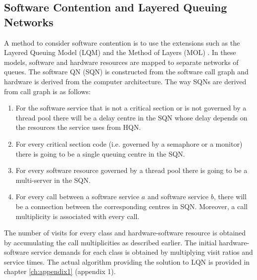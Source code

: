  \subsection{Software Contention and Layered Queuing Networks} 
 A method to consider software contention is to use the extensions such as the Layered Queuing Model (LQM) and the Method of Layers (MOL) \cite{rolia_method_1995}. In these models, software and hardware resources are mapped to separate networks of queues. The software QN \cite{rolia_method_1995} (SQN) is constructed from the software call graph and hardware is derived from the computer architecture. 
 The way SQNs are derived from call graph is as follows:  
 \begin{enumerate} 
 \item For the software service that is not a critical section or is not governed by a thread pool there will be a delay centre in the SQN whose delay depends on the resources the service uses from HQN. 
 \item For every critical section code (i.e. governed by a semaphore or a monitor) there is going to be a single queuing centre in the SQN.
 \item For every software resource governed by a thread pool there is going to be a multi-server in the SQN. 
  \item For every call between a software service $a$ and software service $b$, there will be a connection between the corresponding centres in SQN. Moreover, a call multiplicity is associated with every call.  
 \end{enumerate}
  
   The number of visits for every class and hardware-software resource is obtained by accumulating the call multiplicities as described earlier. The initial hardware-software service demands for each class is obtained by multiplying visit ratios and service times. 
The actual algorithm providing the solution to LQN is provided in chapter \ref{ch:appendix1} (appendix 1).  
  
